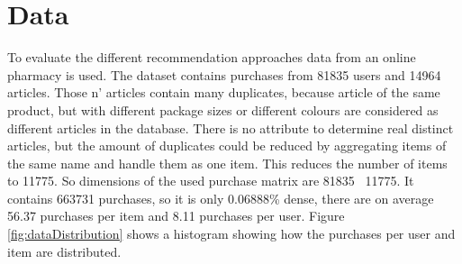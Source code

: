 \documentclass[10pt]{reportMaster}
\begin{document}
\section{Data}
\label{sec:data}

To evaluate the different recommendation approaches data from an online pharmacy is used.
The dataset contains purchases from 81835 users and 14964 articles.
Those n' articles contain many duplicates, because article of the same product, but with different package sizes or different colours are considered as different articles in the database.
There is no attribute to determine real distinct articles, but the amount of duplicates could be reduced by aggregating items of the same name and handle them as one item.
This reduces the number of items to 11775.
So dimensions of the used purchase matrix are 81835 \texttimes \ 11775.
It contains 663731 purchases, so it is only 0.06888\% dense, there are on average 56.37 purchases per item and 8.11 purchases per user. %
Figure \ref{fig:dataDistribution} shows a histogram showing how the purchases per user and item are distributed.

\end{document}
